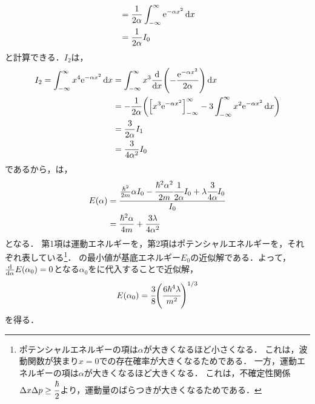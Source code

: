 \documentclass{report}
\begin{document}
\begin{myex}{}{}
\begin{align}
      &= \frac{1}{2\alpha} \int_{-\infty}^{\infty}\mathrm{e}^{-\alpha x^2}\dd{x} \\ 
      &= \frac{1}{2\alpha} I_0\label{E1-I1}
    \end{align}
    と計算できる．$I_2$は，
    \begin{align}
      I_2 = \int_{-\infty}^{\infty}x^4\mathrm{e}^{-\alpha x^2} \dd{x} &= \int_{-\infty}^{\infty}x^3\dv{x}\qty(-\frac{\mathrm{e}^{-\alpha x^2}}{2\alpha}) \dd{x} \\ 
      &= -\frac{1}{2\alpha}\qty(\qty[x^3\mathrm{e}^{-\alpha x^2}]_{-\infty}^{\infty} - 3\int_{-\infty}^{\infty}x^2\mathrm{e}^{-\alpha x^2}\dd{x}) \\ 
      &= \frac{3}{2\alpha}I_1 \\ 
      &= \frac{3}{4\alpha^2}I_0
    \end{align}
    であるから，は，
    \begin{align}
      E(\alpha) &= \frac{\frac{\hbar^2}{2m}\alpha I_0 - \cfrac{\hbar^2\alpha^2}{2m}\cfrac{1}{2\alpha}I_0 + \lambda\cfrac{3}{4\alpha} I_0}{I_0} \\ 
      &= \frac{\hbar^2\alpha}{4m} + \frac{3\lambda}{4\alpha^2}
    \end{align}
    となる．
    第1項は運動エネルギーを，第2項はポテンシャルエネルギーを，それぞれ表している\footnote{
      ポテンシャルエネルギーの項は$\alpha$が大きくなるほど小さくなる．
      これは，波動関数が狭まり$x=0$での存在確率が大きくなるためである．
      一方，運動エネルギーの項は$\alpha$が大きくなるほど大きくなる．
      これは，不確定性関係$\Delta x\Delta p \geq \cfrac{\hbar}{2}$より，運動量のばらつきが大きくなるためである．
    }．
    の最小値が基底エネルギー$E_0$の近似解である．よって，$\dv{\alpha}E(\alpha_0) = 0$となる$\alpha_0$をに代入することで近似解，
    \begin{align}
      E(\alpha_0) = \cfrac{3}{8}\qty(\cfrac{6\hbar^4\lambda}{m^2})^{1/3}
    \end{align}
    を得る．
  \end{myex}
\end{document}
